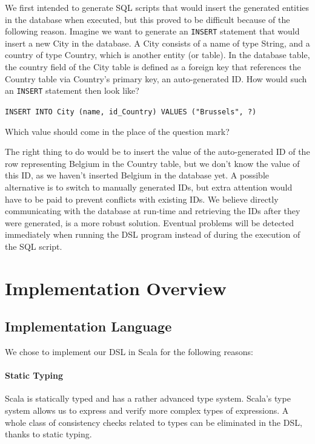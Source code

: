 \documentclass[a4paper]{article}
\newcommand{\cc}[1]{\texttt{#1}}
\begin{document}
We first intended to generate SQL scripts that would insert the generated entities in the database when executed, but this proved to be difficult because of the following reason.
Imagine we want to generate an \cc{INSERT} statement that would insert a new City in the database.
A City consists of a name of type String, and a country of type Country, which is another entity (or table).
In the database table, the country field of the City table is defined as a foreign key that references the Country table via Country's primary key, an auto-generated ID\@.
How would such an \cc{INSERT} statement then look like?

\cc{INSERT INTO City (name, id\_Country) VALUES ("Brussels", ?)}

Which value should come in the place of the question mark?

The right thing to do would be to insert the value of the auto-generated ID of the row representing Belgium in the Country table, but we don't know the value of this ID, as we haven't inserted Belgium in the database yet.
A possible alternative is to switch to manually generated IDs, but extra attention would have to be paid to prevent conflicts with existing IDs.
We believe directly communicating with the database at run-time and retrieving the IDs after they were generated, is a more robust solution.
Eventual problems will be detected immediately when running the DSL program instead of during the execution of the SQL script.


\clearpage
\section{Implementation Overview}
\label{sec:implementation-overview}


\subsection{Implementation Language}
\label{sec:implementation-language}

We chose to implement our DSL in Scala for the following reasons:

\paragraph{Static Typing}
Scala is statically typed and has a rather advanced type system.
Scala's type system allows us to express and verify more complex types of expressions.
A whole class of consistency checks related to types can be eliminated in the DSL, thanks to static typing.
\end{document}
